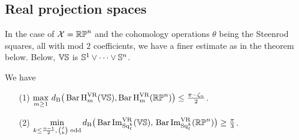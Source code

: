 
\subsection{Real projection spaces}

In the case of $\mathcal{X} = \mathbb{RP}^n$ and the cohomology operations $\theta$ being the Steenrod squares, all with mod $2$ coefficients, we have a finer estimate as in the theorem below.
Below, $\mathbb{V}\mathbb{S}$ is $\mathbb{S}^1\vee\dots\vee \mathbb{S}^n$.

\medskip\theorem
We have
\begin{itemize}
	\item[(1)] $\displaystyle \max_{m\geq 1}\, d_{\mathrm{B}}\big(\operatorname{Bar} \operatorname{H}_{m}^{\mathrm{VR}} (\mathbb{V}\mathbb{S}), \operatorname{Bar} \operatorname{H}_{m}^{\mathrm{VR}} (\mathbb{RP}^n)\big)\leq \tfrac{\pi - \zeta_n}{2}$.
	\smallskip
    \item[(2)] $\displaystyle \min_{%
    k \leq \frac{n-1}{2},\, \binom{\ell}{k}\text{ odd}} \db\big(\sqbarcl{k}{\ell}{\VS},\, \sqbarcl{k}{\ell}{\rp^n}\big)\geq \tfrac{\pi}{3}$. %
\end{itemize}

